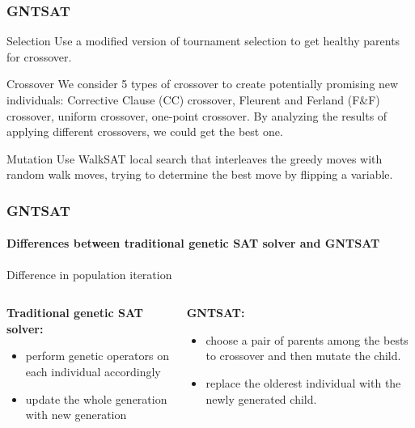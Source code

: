 \begin{frame}
	\frametitle{GNTSAT}
	\begin{block}{Selection}
		Use a modified version of tournament selection to get healthy parents for crossover.
	\end{block}
	\begin{block}{Crossover}
	We consider 5 types of crossover to create potentially promising new individuals: Corrective Clause (CC) crossover,
	Fleurent and Ferland (F\&F) crossover, uniform crossover, one-point crossover. By analyzing the results of applying different crossovers, we could get the best one.
	\end{block}
	\begin{block}{Mutation}
		Use WalkSAT local search that interleaves the greedy moves with random walk moves, trying to determine the best move by flipping a variable.
	\end{block}
\end{frame}
\begin{frame}[t]
	\frametitle{GNTSAT}
	\framesubtitle{Differences between traditional genetic SAT solver and GNTSAT}
	\begin{block}{Difference in population iteration}
		\begin{columns}[t]
			\begin{column}{0.5\textwidth}
				\textbf{Traditional genetic SAT solver:}
				\begin{itemize}
				\item perform genetic operators on each individual accordingly
				\item update the whole generation with new generation
				\end{itemize}
			\end{column}
			\begin{column}{0.5\textwidth}
				\textbf{GNTSAT:}
				\begin{itemize}
				\item choose a pair of parents among the bests to crossover and then mutate the child. 
				\item replace the olderest individual with the newly generated child.
				\end{itemize}
				\end{column}
			\end{columns}
	\end{block}
\end{frame}

